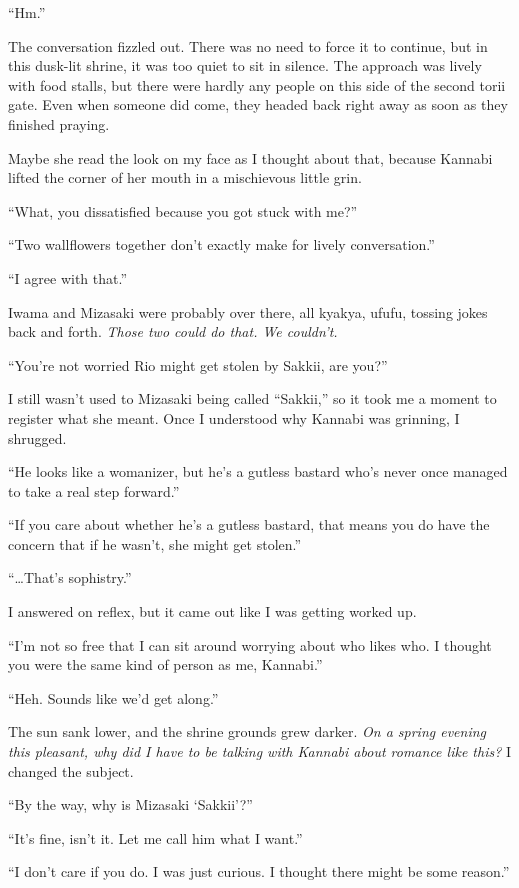\documentclass[
    a4paper,
    12pt,
    twoside,
    openany,
    UTF8,
    fontset=windows
]{ctexbook}
\begin{document}
``Hm.''

The conversation fizzled out. There was no need to force it to continue, but in this dusk-lit shrine, it was too quiet to sit in silence. The approach was lively with food stalls, but there were hardly any people on this side of the second torii gate. Even when someone did come, they headed back right away as soon as they finished praying.

Maybe she read the look on my face as I thought about that, because Kannabi lifted the corner of her mouth in a mischievous little grin.

``What, you dissatisfied because you got stuck with me?''

``Two wallflowers together don't exactly make for lively conversation.''

``I agree with that.''

Iwama and Mizasaki were probably over there, all kyakya, ufufu, tossing jokes back and forth. \textit{Those two could do that. We couldn't.}

``You're not worried Rio might get stolen by Sakkii, are you?''

I still wasn't used to Mizasaki being called ``Sakkii,'' so it took me a moment to register what she meant. Once I understood why Kannabi was grinning, I shrugged.

``He looks like a womanizer, but he's a gutless bastard who's never once managed to take a real step forward.''

``If you care about whether he's a gutless bastard, that means you do have the concern that if he wasn't, she might get stolen.''

``\dots That's sophistry.''

I answered on reflex, but it came out like I was getting worked up.

``I'm not so free that I can sit around worrying about who likes who. I thought you were the same kind of person as me, Kannabi.''

``Heh. Sounds like we'd get along.''

The sun sank lower, and the shrine grounds grew darker. \textit{On a spring evening this pleasant, why did I have to be talking with Kannabi about romance like this?} I changed the subject.

``By the way, why is Mizasaki `Sakkii'?''

``It's fine, isn't it. Let me call him what I want.''

``I don't care if you do. I was just curious. I thought there might be some reason.''
\end{document}
